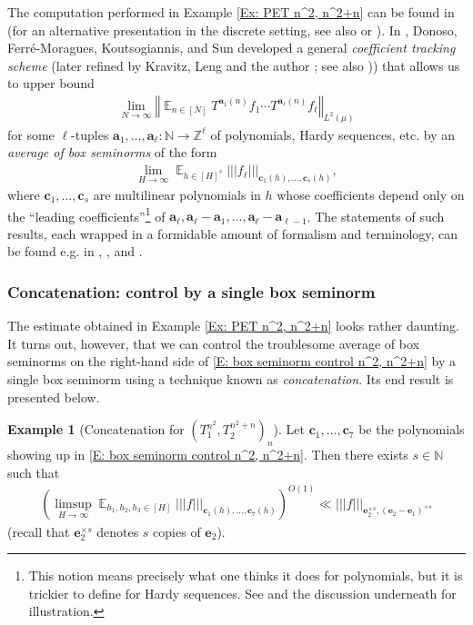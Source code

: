 \documentclass[11pt]{amsart}
\theoremstyle{definition}
\newtheorem{example}[lemma]{Example}
\DeclareMathOperator*{\E}{\mathbb{E}}
\newcommand{\N}{{\mathbb N}}
\newcommand{\Z}{{\mathbb Z}}
\newcommand{\ba}{\mathbf{a}}
\newcommand{\bc}{{\mathbf{c}}}
\newcommand{\be}{{\mathbf{e}}}
\newcommand{\norm}[1]{\left\Vert #1\right\Vert}
\newcommand{\nnorm}[1]{\lvert\!|\!| #1|\!|\!\rvert}
\newcommand{\1}{{\mathbf{1}}}
\newcommand{\brac}[1]{\mathopen{}\left( #1 \mathclose{}\right)}
\begin{document}
The computation performed in Example \ref{Ex: PET n^2, n^2+n} can be found in \cite[Example 7]{DFKS22} (for an alternative presentation in the discrete setting, see also \cite[Example 2]{Kuc23} or \cite[Section 4.1]{KKL24a}). In \cite[Section 4]{DFKS22}, Donoso, Ferr\'e-Moragues, Koutsogiannis, and Sun developed a general \emph{coefficient tracking scheme} (later refined by Kravitz, Leng and the author \cite[Section 4]{KKL24a}; see also \cite[Section 7.1]{DKKST24})) that allows us to upper bound
\begin{align}\label{E: general average with products}
    \lim_{N\to\infty}\norm{\E_{n\in[N]}T^{\ba_1(n)}f_1 \cdots T^{\ba_\ell(n)}f_\ell}_{L^2(\mu)}
\end{align}
for some $\ell$-tuples $\ba_1, \ldots, \ba_\ell:\N\to\Z^\ell$ of polynomials, Hardy sequences, etc.
by an \emph{average of box seminorms} of the form
\begin{align*}
    \lim_{H\to\infty}\E_{h\in [H]^s}\nnorm{f_\ell}_{\bc_1(h), \ldots, \bc_s(h)},
\end{align*}
where $\bc_1, \ldots,\bc_s$ are multilinear polynomials in $h$ whose coefficients depend only on the ``leading coefficients''\footnote{This notion means precisely what one thinks it does for polynomials, but it is trickier to define for Hardy sequences. See \cite[Theorem 10.1]{DKKST24} and the discussion underneath for illustration.} of $\ba_\ell, \ba_\ell-\ba_1, \ldots, \ba_\ell-\ba_{\ell-1}$. The statements of such results, each wrapped in a formidable amount of formalism and terminology, can be found e.g. in \cite[Proposition 5.3]{DFKS22}, \cite[Proposition 4.9]{KKL24a}, and \cite[Proposition 7.7]{DKKST24}.

\subsubsection{Concatenation: control by a single box seminorm}\label{SSS: concatenation}
The estimate obtained in Example \ref{Ex: PET n^2, n^2+n} looks rather daunting. It turns out, however, that we can control the troublesome average of box seminorms on the right-hand side of \eqref{E: box seminorm control n^2, n^2+n} by a single box seminorm using a technique known as \emph{concatenation}. Its end result is presented below.
\begin{example}[Concatenation for $(T_1^{n^2}, T_2^{n^2+n})_n$]\label{Ex: concatenation n^2, n^2+n}
    Let $\bc_1, \ldots, \bc_7$ be the polynomials showing up in \eqref{E: box seminorm control n^2, n^2+n}. Then there exists $s\in\N$ such that
    \begin{align}\label{E: concatenation n^2, n^2+n}
        \brac{\limsup_{H\to\infty}\E_{h_1,h_2,h_3\in[H]}\nnorm{f}_{\bc_1(h), \ldots, \bc_7(h)}}^{O(1)}\ll \nnorm{f}_{\be_2^{\times s}, (\be_2-\be_1)^{\times s}}
    \end{align}
    (recall that $\be_2^{\times s}$ denotes $s$ copies of $\be_2$). 
\end{example}
\end{document}
